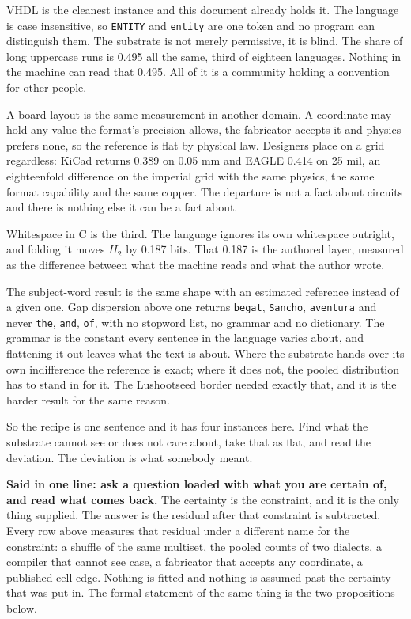 VHDL is the cleanest instance and this document already holds it. The language is case insensitive, so \texttt{ENTITY} and \texttt{entity} are one token and no program can distinguish them. The substrate is not merely permissive, it is blind. The share of long uppercase runs is 0.495 all the same, third of eighteen languages. Nothing in the machine can read that 0.495. All of it is a community holding a convention for other people.

A board layout is the same measurement in another domain. A coordinate may hold any value the format's precision allows, the fabricator accepts it and physics prefers none, so the reference is flat by physical law. Designers place on a grid regardless: KiCad returns 0.389 on 0.05 mm and EAGLE 0.414 on 25 mil, an eighteenfold difference on the imperial grid with the same physics, the same format capability and the same copper. The departure is not a fact about circuits and there is nothing else it can be a fact about.

Whitespace in C is the third. The language ignores its own whitespace outright, and folding it moves \(H_2\) by 0.187 bits. That 0.187 is the authored layer, measured as the difference between what the machine reads and what the author wrote.

The subject-word result is the same shape with an estimated reference instead of a given one. Gap dispersion above one returns \texttt{begat}, \texttt{Sancho}, \texttt{aventura} and never \texttt{the}, \texttt{and}, \texttt{of}, with no stopword list, no grammar and no dictionary. The grammar is the constant every sentence in the language varies about, and flattening it out leaves what the text is about. Where the substrate hands over its own indifference the reference is exact; where it does not, the pooled distribution has to stand in for it. The Lushootseed border needed exactly that, and it is the harder result for the same reason.

So the recipe is one sentence and it has four instances here. Find what the substrate cannot see or does not care about, take that as flat, and read the deviation. The deviation is what somebody meant.

\textbf{Said in one line: ask a question loaded with what you are certain of, and read what comes back.} The certainty is the constraint, and it is the only thing supplied. The answer is the residual after that constraint is subtracted. Every row above measures that residual under a different name for the constraint: a shuffle of the same multiset, the pooled counts of two dialects, a compiler that cannot see case, a fabricator that accepts any coordinate, a published cell edge. Nothing is fitted and nothing is assumed past the certainty that was put in. The formal statement of the same thing is the two propositions below.

